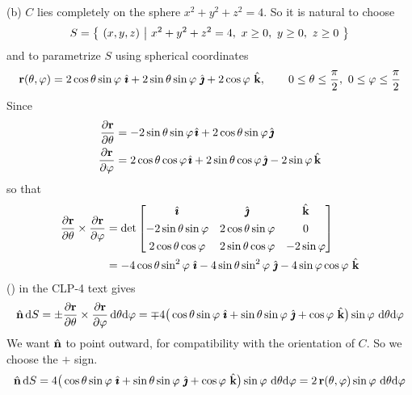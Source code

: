 \begin{solution}
(b) $C$ lies completely on the sphere $x^2+y^2+z^2=4$. So it is natural
to choose
\begin{equation*}
S=\Set{(x,y,z)}{x^2+y^2+z^2=4,\ x\ge 0,\ y\ge 0,\ z\ge 0}
\end{equation*}
and to parametrize $S$ using spherical coordinates
\begin{equation*}
\vr(\theta,\varphi)
= 2\cos\theta\sin\varphi\ \hi
+ 2\sin\theta\sin\varphi\ \hj
+ 2\cos\varphi\ \hk,\qquad
0\le\theta\le\frac{\pi}{2},\ 
0\le\varphi\le\frac{\pi}{2}
\end{equation*}
Since
\begin{align*}
\frac{\partial\mathbf{r}}{\partial\theta}
&= -2\sin\theta\sin\varphi\,\hat{\pmb{\imath}} +2\cos\theta\sin\varphi\,\hat{\pmb{\jmath}}  \\
\frac{\partial\mathbf{r}}{\partial\varphi}
&= 2\cos\theta\cos\varphi\,\hat{\pmb{\imath}} +2\sin\theta\cos\varphi\,\hat{\pmb{\jmath}} 
  - 2\sin\varphi\,\hat{\mathbf{k}}
\end{align*}
so that
\begin{align*}
\frac{\partial\mathbf{r}}{\partial\theta}\times\frac{\partial\mathbf{r}}{\partial\varphi}
&= \det\left[\begin{matrix} \hat{\pmb{\imath}} & \hat{\pmb{\jmath}} & \hat{\mathbf{k}} \\[0.05in]
-2\sin\theta\sin\varphi & 2\cos\theta\sin\varphi & 0 \\[0.05in]
2\cos\theta\cos\varphi & 2\sin\theta\cos\varphi & - 2\sin\varphi
         \end{matrix}\right] \\
&= -4\cos\theta\sin^2\varphi\ \hat{\pmb{\imath}}
   -4\sin\theta\sin^2\varphi\ \hat{\pmb{\jmath}}
   -4\sin\varphi\cos\varphi\ \hat{\mathbf{k}}
\end{align*}
() in the CLP-4 text gives
\begin{align*}
\hat{\mathbf{n}}\,\mathrm{d}S = \pm \frac{\partial\mathbf{r}}{\partial\theta}\times
            \frac{\partial\mathbf{r}}{\partial\varphi}\,\mathrm{d}\theta\mathrm{d}\varphi
= \mp 4\big(\cos\theta\sin\varphi\ \hat{\pmb{\imath}}
            +\sin\theta\sin\varphi\ \hat{\pmb{\jmath}}
            +\cos\varphi\ \hat{\mathbf{k}}\big)
          \sin\varphi\ \mathrm{d}\theta\mathrm{d}\varphi
\end{align*}
We want $\hat{\mathbf{n}}$ to point outward, for compatibility with the orientation
of $C$. So we choose the $+$ sign.
\begin{align*}
\hat{\mathbf{n}}\,\mathrm{d}S 
= 4\big(\cos\theta\sin\varphi\ \hat{\pmb{\imath}}
            +\sin\theta\sin\varphi\ \hat{\pmb{\jmath}}
            +\cos\varphi\ \hat{\mathbf{k}}\big)
          \sin\varphi\ \mathrm{d}\theta\mathrm{d}\varphi
=2\,\mathbf{r}(\theta,\varphi)\sin\varphi\ \mathrm{d}\theta\mathrm{d}\varphi
\end{align*}


\end{solution}
